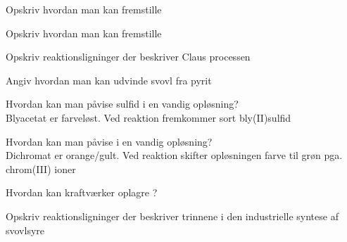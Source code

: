 \begin{flashcard}[Fremstilling]{Opskriv hvordan man kan fremstille }
\end{flashcard}

\begin{flashcard}[Fremstilling]{Opskriv hvordan man kan fremstille }
\end{flashcard}

\begin{flashcard}[Fremstilling]{Opskriv reaktionsligninger der beskriver Claus processen}
\\
\end{flashcard}

\begin{flashcard}[Fremstilling]{Angiv hvordan man kan udvinde svovl fra pyrit}
\end{flashcard}

\begin{flashcard}[Reaktion]{Hvordan kan man påvise sulfid i en vandig opløsning?}
\\ \vspace{7pt}
Blyacetat er farveløst. Ved reaktion fremkommer sort bly(II)sulfid
\end{flashcard}

\begin{flashcard}[Reaktion]{Hvordan kan man påvise  i en vandig opløsning?}
\\ \vspace{7pt}
Dichromat er orange/gult. Ved reaktion skifter opløsningen farve til grøn pga. chrom(III) ioner
\end{flashcard}

\begin{flashcard}[Reaktion]{Hvordan kan kraftværker oplagre ?}
\end{flashcard}

\begin{flashcard}[Fremstilling]{Opskriv reaktionsligninger der beskriver trinnene i den industrielle syntese af svovlsyre}
\\
\\
\\
\end{flashcard}

